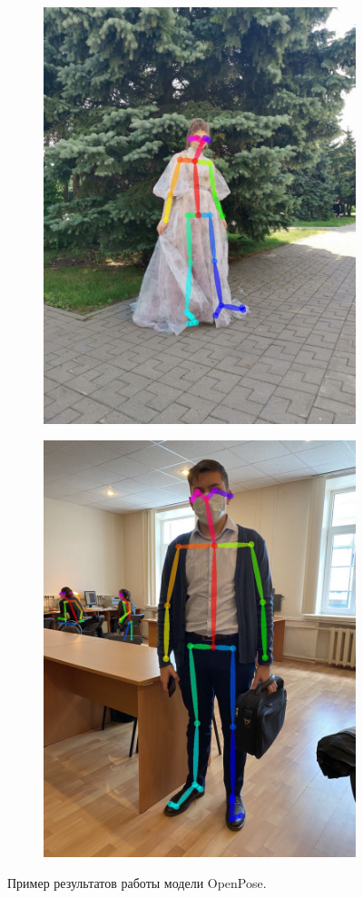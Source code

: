 \begin{figure}[h]
\begin{subfigure}[b]{.5\textwidth}
   \includegraphics[height=\textwidth]{./images/OpenPose/36}
   \caption{ }
\end{subfigure}
\begin{subfigure}[b]{.5\textwidth}
	\centering
   \includegraphics[height=\textwidth]{./images/OpenPose/33}
   \caption{ }
\end{subfigure}
   \caption{Пример результатов работы модели OpenPose.}
   \label{fig:OP_result}
\end{figure}

